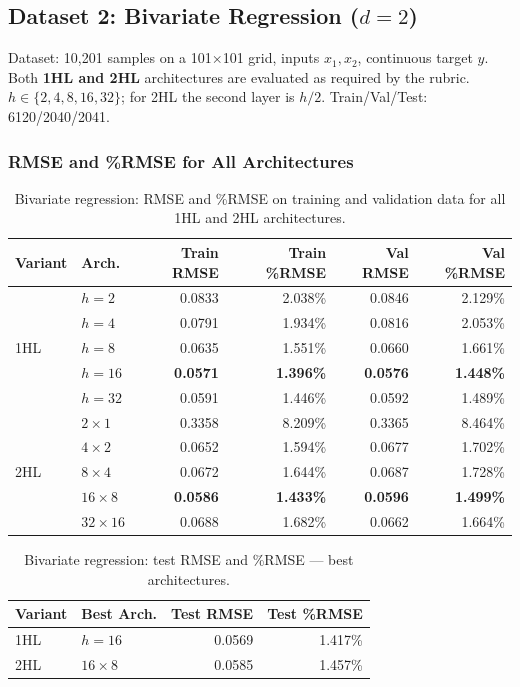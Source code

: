 \documentclass[11pt,a4paper]{article}
\begin{document}
\subsection{Dataset 2: Bivariate Regression ($d=2$)}

Dataset: 10,201 samples on a 101$\times$101 grid, inputs $x_1,x_2$, continuous target $y$. Both \textbf{1HL and 2HL} architectures are evaluated as required by the rubric. $h \in \{2,4,8,16,32\}$; for 2HL the second layer is $h/2$. Train/Val/Test: 6120/2040/2041.

\subsubsection*{RMSE and \%RMSE for All Architectures}

\begin{table}[H]
\centering
\caption{Bivariate regression: RMSE and \%RMSE on training and validation data for all 1HL and 2HL architectures.}
\small
\begin{tabular}{llrrrr}
\toprule
Variant & Arch. & Train RMSE & Train \%RMSE & Val RMSE & Val \%RMSE \\
\midrule
\multirow{5}{*}{1HL}
 & $h=2$   & 0.0833 & 2.038\% & 0.0846 & 2.129\% \\
 & $h=4$   & 0.0791 & 1.934\% & 0.0816 & 2.053\% \\
 & $h=8$   & 0.0635 & 1.551\% & 0.0660 & 1.661\% \\
 & \textbf{$h=16$} & \textbf{0.0571} & \textbf{1.396\%} & \textbf{0.0576} & \textbf{1.448\%} \\
 & $h=32$  & 0.0591 & 1.446\% & 0.0592 & 1.489\% \\
\midrule
\multirow{5}{*}{2HL}
 & $2\times1$   & 0.3358 & 8.209\% & 0.3365 & 8.464\% \\
 & $4\times2$   & 0.0652 & 1.594\% & 0.0677 & 1.702\% \\
 & $8\times4$   & 0.0672 & 1.644\% & 0.0687 & 1.728\% \\
 & \textbf{$16\times8$} & \textbf{0.0586} & \textbf{1.433\%} & \textbf{0.0596} & \textbf{1.499\%} \\
 & $32\times16$ & 0.0688 & 1.682\% & 0.0662 & 1.664\% \\
\bottomrule
\end{tabular}
\end{table}

\begin{table}[H]
\centering
\caption{Bivariate regression: test RMSE and \%RMSE --- best architectures.}
\begin{tabular}{llrr}
\toprule
Variant & Best Arch. & Test RMSE & Test \%RMSE \\
\midrule
1HL & $h=16$     & 0.0569 & 1.417\% \\
2HL & $16\times8$ & 0.0585 & 1.457\% \\
\bottomrule
\end{tabular}
\end{table}
\end{document}
